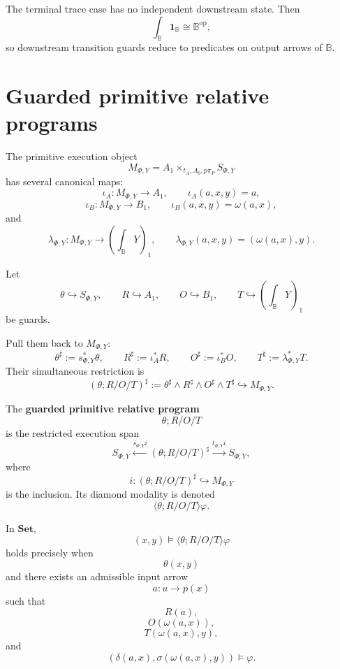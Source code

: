 The terminal trace case has no independent downstream state.  Then
\[
\int_{\mathbb B}\mathbf 1_{\mathbb B}\cong\mathbb B^{\mathrm{op}},
\]
so downstream transition guards reduce to predicates on output arrows of
\(\mathbb B\).

\section{Guarded primitive relative programs}
\label{sec:poly-relative-guarded-primitive-programs}

The primitive execution object
\[
M_{\Phi,Y}
=
A_1\times_{t_A,A_0,p\pi_P}S_{\Phi,Y}
\]
has several canonical maps:
\[
\iota_A:M_{\Phi,Y}\to A_1,
\qquad
\iota_A(a,x,y)=a,
\]
\[
\iota_B:M_{\Phi,Y}\to B_1,
\qquad
\iota_B(a,x,y)=\omega(a,x),
\]
and
\[
\lambda_{\Phi,Y}:M_{\Phi,Y}\to
\left(\int_{\mathbb B}Y\right)_1,
\qquad
\lambda_{\Phi,Y}(a,x,y)=(\omega(a,x),y).
\]

Let
\[
\theta\hookrightarrow S_{\Phi,Y},
\qquad
R\hookrightarrow A_1,
\qquad
O\hookrightarrow B_1,
\qquad
T\hookrightarrow \left(\int_{\mathbb B}Y\right)_1
\]
be guards.

Pull them back to \(M_{\Phi,Y}\):
\[
\theta^\sharp:=s_{\Phi,Y}^\ast\theta,
\qquad
R^\sharp:=\iota_A^\ast R,
\qquad
O^\sharp:=\iota_B^\ast O,
\qquad
T^\sharp:=\lambda_{\Phi,Y}^\ast T.
\]
Their simultaneous restriction is
\[
(\theta;R/O/T)^\sharp
:=
\theta^\sharp\wedge R^\sharp\wedge O^\sharp\wedge T^\sharp
\hookrightarrow M_{\Phi,Y}.
\]

\begin{definition}
\label{def:poly-relative-guarded-primitive-relative-program}
The \textbf{guarded primitive relative program}
\[
\theta;R/O/T
\]
is the restricted execution span
\[
S_{\Phi,Y}
\xleftarrow{s_{\Phi,Y}i}
(\theta;R/O/T)^\sharp
\xrightarrow{t_{\Phi,Y}i}
S_{\Phi,Y},
\]
where
\[
i:(\theta;R/O/T)^\sharp\hookrightarrow M_{\Phi,Y}
\]
is the inclusion.  Its diamond modality is denoted
\[
\langle \theta;R/O/T\rangle\varphi.
\]
\end{definition}

\begin{proposition}
\label{prop:poly-relative-guarded-primitive-external}
In \(\mathbf{Set}\),
\[
(x,y)\models \langle \theta;R/O/T\rangle\varphi
\]
holds precisely when
\[
\theta(x,y)
\]
and there exists an admissible input arrow
\[
a:u\to p(x)
\]
such that
\[
R(a),
\]
\[
O(\omega(a,x)),
\]
\[
T(\omega(a,x),y),
\]
and
\[
\left(
\delta(a,x),
\sigma(\omega(a,x),y)
\right)
\models\varphi.
\]
\end{proposition}


